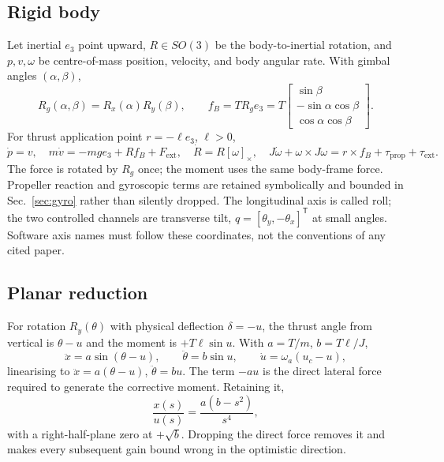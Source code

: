 \documentclass[11pt,a4paper]{article}
\begin{document}
\subsection{Rigid body}

Let inertial $e_3$ point upward, $R\in SO(3)$ be the body-to-inertial rotation, and $p,v,\omega$ be
centre-of-mass position, velocity, and body angular rate. With gimbal angles $(\alpha,\beta)$,
\begin{equation}
R_g(\alpha,\beta)=R_x(\alpha)R_y(\beta),\qquad
f_B = T R_g e_3 = T\begin{bmatrix}\sin\beta\\ -\sin\alpha\cos\beta\\ \cos\alpha\cos\beta\end{bmatrix}.
\end{equation}
For thrust application point $r=-\ell e_3$, $\ell>0$,
\begin{equation}
\dot p = v,\quad m\dot v = -mge_3 + Rf_B + F_{\text{ext}},\quad
\dot R = R[\omega]_\times,\quad J\dot\omega + \omega\times J\omega = r\times f_B + \tau_{\text{prop}} + \tau_{\text{ext}}.
\end{equation}
The force is rotated by $R_g$ once; the moment uses the same body-frame force. Propeller reaction and
gyroscopic terms are retained symbolically and bounded in Sec.~\ref{sec:gyro} rather than silently
dropped. The longitudinal axis is called roll; the two controlled channels are transverse tilt,
$q=[\theta_y,-\theta_x]^{\mathsf T}$ at small angles. Software axis names must follow these
coordinates, not the conventions of any cited paper.

\subsection{Planar reduction}

For rotation $R_y(\theta)$ with physical deflection $\delta=-u$, the thrust angle from vertical is
$\theta-u$ and the moment is $+T\ell\sin u$. With $a=T/m$, $b=T\ell/J$,
\begin{equation}
\ddot x = a\sin(\theta-u),\qquad \ddot\theta = b\sin u,\qquad \dot u = \omega_a(u_c-u),
\end{equation}
linearising to $\ddot x = a(\theta-u)$, $\ddot\theta = bu$. The term $-au$ is the direct lateral force
required to generate the corrective moment. Retaining it,
\begin{equation}
\frac{x(s)}{u(s)} = \frac{a(b-s^2)}{s^4},
\end{equation}
with a right-half-plane zero at $+\sqrt b$. Dropping the direct force removes it and makes every
subsequent gain bound wrong in the optimistic direction.
\end{document}
